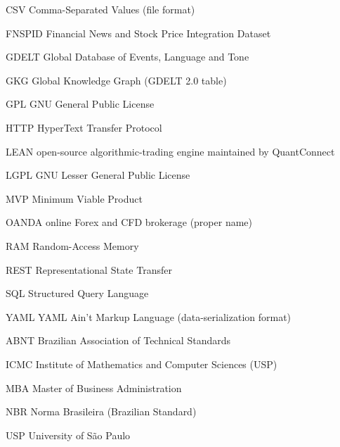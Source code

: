 \begin{siglas}
    \item[CSV] Comma-Separated Values (file format)
    \item[FNSPID] Financial News and Stock Price Integration Dataset
    \item[GDELT] Global Database of Events, Language and Tone
    \item[GKG] Global Knowledge Graph (GDELT 2.0 table)
    \item[GPL] GNU General Public License
    \item[HTTP] HyperText Transfer Protocol
    \item[LEAN] open-source algorithmic-trading engine maintained by QuantConnect
    \item[LGPL] GNU Lesser General Public License
    \item[MVP] Minimum Viable Product
    \item[OANDA] online Forex and CFD brokerage (proper name)
    \item[RAM] Random-Access Memory
    \item[REST] Representational State Transfer
    \item[SQL] Structured Query Language
    \item[YAML] YAML Ain't Markup Language (data-serialization format)
    \item[ABNT] Brazilian Association of Technical Standards
    \item[ICMC] Institute of Mathematics and Computer Sciences (USP)
    \item[MBA] Master of Business Administration
    \item[NBR] Norma Brasileira (Brazilian Standard)
    \item[USP] University of S\~ao Paulo
\end{siglas}
